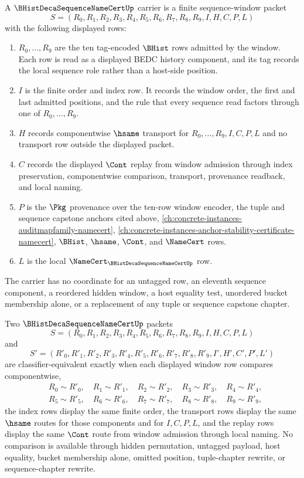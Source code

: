 \begin{definition}
\label{def:b-hist-deca-sequence-name-cert-carrier}
A $\BHistDecaSequenceNameCertUp$ carrier is a finite sequence-window packet
$$
S=(R_0,R_1,R_2,R_3,R_4,R_5,R_6,R_7,R_8,R_9,I,H,C,P,L)
$$
with the following displayed rows:
\begin{enumerate}
\item $R_0,\ldots,R_9$ are the ten tag-encoded $\BHist$ rows admitted by the window. Each row is read as a displayed BEDC history component, and its tag records the local sequence role rather than a host-side position.
\item $I$ is the finite order and index row. It records the window order, the first and last admitted positions, and the rule that every sequence read factors through one of $R_0,\ldots,R_9$.
\item $H$ records componentwise $\hsame$ transport for $R_0,\ldots,R_9,I,C,P,L$ and no transport row outside the displayed packet.
\item $C$ records the displayed $\Cont$ replay from window admission through index preservation, componentwise comparison, transport, provenance readback, and local naming.
\item $P$ is the $\Pkg$ provenance over the ten-row window encoder, the tuple and sequence capstone anchors cited above, \autoref{ch:concrete-instances-auditmapfamily-namecert}, \autoref{ch:concrete-instances-anchor-stability-certificate-namecert}, $\BHist$, $\hsame$, $\Cont$, and $\NameCert$ rows.
\item $L$ is the local $\NameCert_{\BHistDecaSequenceNameCertUp}$ row.
\end{enumerate}
The carrier has no coordinate for an untagged row, an eleventh sequence component, a reordered hidden window, a host equality test, unordered bucket membership alone, or a replacement of any tuple or sequence capstone chapter.
\end{definition}

\begin{definition}
\label{def:b-hist-deca-sequence-name-cert-classifier}
Two $\BHistDecaSequenceNameCertUp$ packets
$$
S=(R_0,R_1,R_2,R_3,R_4,R_5,R_6,R_7,R_8,R_9,I,H,C,P,L)
$$
and
$$
S'=(R'_0,R'_1,R'_2,R'_3,R'_4,R'_5,R'_6,R'_7,R'_8,R'_9,I',H',C',P',L')
$$
are classifier-equivalent exactly when each displayed window row compares componentwise,
$$
\begin{aligned}
&R_0 \sim R'_0,\quad R_1 \sim R'_1,\quad R_2 \sim R'_2,\quad R_3 \sim R'_3,\quad R_4 \sim R'_4,\\
&R_5 \sim R'_5,\quad R_6 \sim R'_6,\quad R_7 \sim R'_7,\quad R_8 \sim R'_8,\quad R_9 \sim R'_9,
\end{aligned}
$$
the index rows display the same finite order, the transport rows display the same $\hsame$ routes for those components and for $I,C,P,L$, and the replay rows display the same $\Cont$ route from window admission through local naming. No comparison is available through hidden permutation, untagged payload, host equality, bucket membership alone, omitted position, tuple-chapter rewrite, or sequence-chapter rewrite.
\end{definition}

